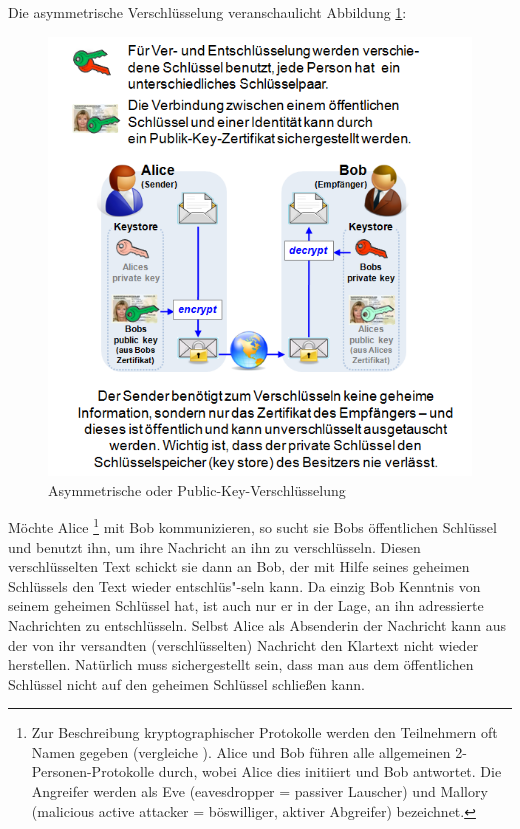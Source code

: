 \begin{refsegment}
Die asymmetrische Verschlüsselung veranschaulicht Abbildung \ref{cm_Figure_Asymmetric-Enc_Public-Key-Enc}:
\begin{figure}[ht]
\begin{center}
\includegraphics[scale=0.7]{figures/AsymmetricEnc_Figure_Chap1_de.png}
\caption{Asymmetrische oder Public-Key-Verschlüsselung}
\label{cm_Figure_Asymmetric-Enc_Public-Key-Enc}
\end{center}
\end{figure}

Möchte Alice%
\footnote{%
  Zur Beschreibung kryptographischer Protokolle werden den Teilnehmern
  oft Namen gegeben (vergleiche \cite[S. 23]{Schneier1996}).
  Alice und Bob führen alle allgemeinen 2-Personen-Protokolle durch,
  wobei Alice dies initiiert und Bob antwortet.
  Die Angreifer werden als Eve (eavesdropper = passiver Lauscher) und
  Mallory (malicious active attacker = böswilliger, aktiver Abgreifer)
  bezeichnet.
  }
mit Bob kommunizieren, so sucht sie Bobs öffentlichen Schlüssel
und benutzt ihn, um ihre Nachricht an ihn zu
verschlüsseln. Diesen verschlüsselten Text schickt sie dann an Bob,
der mit Hilfe seines geheimen Schlüssels den Text wieder entschlüs"-seln
kann. Da einzig Bob Kenntnis von seinem geheimen Schlüssel hat, ist
auch nur er in der Lage, an ihn adressierte Nachrichten zu
entschlüsseln.
Selbst Alice als Absenderin der Nachricht kann aus der von ihr
versandten (verschlüsselten) Nachricht den Klartext nicht wieder
herstellen. Natürlich muss sichergestellt sein, dass man aus dem
öffentlichen Schlüssel nicht auf den geheimen Schlüssel schließen
kann.


\end{refsegment}

